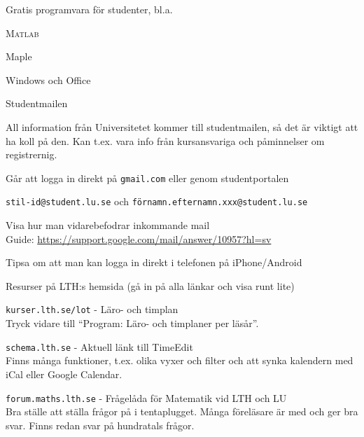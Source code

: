 \documentclass[10pt]{article}
\begin{document}
\begin{dashlist}
\begin{dashlist}
            \item Gratis programvara för studenter, bl.a.
            \begin{dashlist}
                \item \textsc{Matlab}
                \item Maple
                \item Windows och Office
            \end{dashlist}
        \end{dashlist}

        \item Studentmailen
        \begin{dashlist}
            \item All information från Universitetet kommer till studentmailen, så det är viktigt att ha koll på den. Kan t.ex. vara info från kursansvariga och påminnelser om registrernig.
            \item Går att logga in direkt på \texttt{gmail.com} eller genom studentportalen
            \item \texttt{stil-id@student.lu.se} och \texttt{förnamn.efternamn.xxx@student.lu.se}
            \item Visa hur man vidarebefodrar inkommande mail\\
            Guide: \url{https://support.google.com/mail/answer/10957?hl=sv}
            \item Tipsa om att man kan logga in direkt i telefonen på iPhone/Android
        \end{dashlist}

        \item Resurser på LTH:s hemsida (gå in på alla länkar och visa runt lite)
        \begin{dashlist}
            \item \texttt{kurser.lth.se/lot} - Läro- och timplan\\
                Tryck vidare till ``Program: Läro- och timplaner per läsår''.
            \item \texttt{schema.lth.se} - Aktuell länk till TimeEdit\\
                Finns många funktioner, t.ex. olika vyxer och filter och att synka kalendern med iCal eller Google Calendar.
            \item \texttt{forum.maths.lth.se} - Frågelåda för Matematik vid LTH och LU\\
                Bra ställe att ställa frågor på i tentaplugget. Många föreläsare är med och ger bra svar. Finns redan svar på hundratals frågor.
        \end{dashlist}


\end{dashlist}
\end{document}
